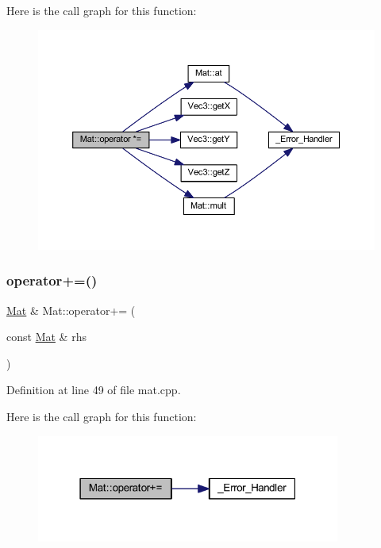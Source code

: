 Here is the call graph for this function\+:
\nopagebreak
\begin{figure}[H]
\begin{center}
\leavevmode
\includegraphics[width=350pt]{class_mat_a8f508e70094f29bf8bd428e3d41013e8_cgraph}
\end{center}
\end{figure}
\mbox{\label{class_mat_a649fa81760478538ff4db14b9572fd81}} 
\subsubsection{\texorpdfstring{operator+=()}{operator+=()}}
{\footnotesize\ttfamily \mbox{\hyperlink{class_mat}{Mat}} \& Mat\+::operator+= (\begin{DoxyParamCaption}\item[{const \mbox{\hyperlink{class_mat}{Mat}} \&}]{rhs }\end{DoxyParamCaption})}



Definition at line 49 of file mat.\+cpp.

Here is the call graph for this function\+:
\nopagebreak
\begin{figure}[H]
\begin{center}
\leavevmode
\includegraphics[width=283pt]{class_mat_a649fa81760478538ff4db14b9572fd81_cgraph}
\end{center}
\end{figure}
\mbox{\label{class_mat_a2bb1e2bbfba19148a87b67288ed7fc91}} 
